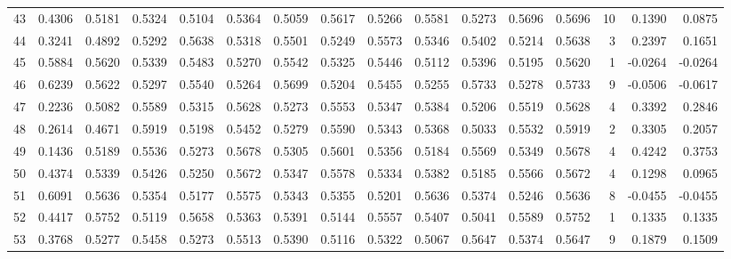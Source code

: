 \begin{tabular}{lrrrrrrrrrrrrrrr}
43  &      0.4306 &  0.5181 &  0.5324 &  0.5104 &  0.5364 &  0.5059 &  0.5617 &  0.5266 &  0.5581 &  0.5273 &   0.5696 &     0.5696 &     10 &                    0.1390 &                     0.0875 \\
44  &      0.3241 &  0.4892 &  0.5292 &  0.5638 &  0.5318 &  0.5501 &  0.5249 &  0.5573 &  0.5346 &  0.5402 &   0.5214 &     0.5638 &      3 &                    0.2397 &                     0.1651 \\
45  &      0.5884 &  0.5620 &  0.5339 &  0.5483 &  0.5270 &  0.5542 &  0.5325 &  0.5446 &  0.5112 &  0.5396 &   0.5195 &     0.5620 &      1 &                   -0.0264 &                    -0.0264 \\
46  &      0.6239 &  0.5622 &  0.5297 &  0.5540 &  0.5264 &  0.5699 &  0.5204 &  0.5455 &  0.5255 &  0.5733 &   0.5278 &     0.5733 &      9 &                   -0.0506 &                    -0.0617 \\
47  &      0.2236 &  0.5082 &  0.5589 &  0.5315 &  0.5628 &  0.5273 &  0.5553 &  0.5347 &  0.5384 &  0.5206 &   0.5519 &     0.5628 &      4 &                    0.3392 &                     0.2846 \\
48  &      0.2614 &  0.4671 &  0.5919 &  0.5198 &  0.5452 &  0.5279 &  0.5590 &  0.5343 &  0.5368 &  0.5033 &   0.5532 &     0.5919 &      2 &                    0.3305 &                     0.2057 \\
49  &      0.1436 &  0.5189 &  0.5536 &  0.5273 &  0.5678 &  0.5305 &  0.5601 &  0.5356 &  0.5184 &  0.5569 &   0.5349 &     0.5678 &      4 &                    0.4242 &                     0.3753 \\
50  &      0.4374 &  0.5339 &  0.5426 &  0.5250 &  0.5672 &  0.5347 &  0.5578 &  0.5334 &  0.5382 &  0.5185 &   0.5566 &     0.5672 &      4 &                    0.1298 &                     0.0965 \\
51  &      0.6091 &  0.5636 &  0.5354 &  0.5177 &  0.5575 &  0.5343 &  0.5355 &  0.5201 &  0.5636 &  0.5374 &   0.5246 &     0.5636 &      8 &                   -0.0455 &                    -0.0455 \\
52  &      0.4417 &  0.5752 &  0.5119 &  0.5658 &  0.5363 &  0.5391 &  0.5144 &  0.5557 &  0.5407 &  0.5041 &   0.5589 &     0.5752 &      1 &                    0.1335 &                     0.1335 \\
53  &      0.3768 &  0.5277 &  0.5458 &  0.5273 &  0.5513 &  0.5390 &  0.5116 &  0.5322 &  0.5067 &  0.5647 &   0.5374 &     0.5647 &      9 &                    0.1879 &                     0.1509 \\

\end{tabular}
